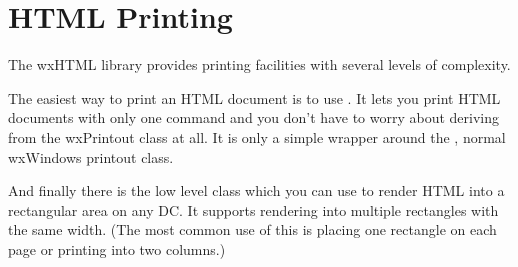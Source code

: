 \section{HTML Printing}\label{printing}

The wxHTML library provides printing facilities with several levels of complexity. 

The easiest way to print an HTML document is to use 
. It lets you print HTML documents with only one
command and you don't have to worry about deriving from the wxPrintout class at all. It is only a simple wrapper around the 
, normal wxWindows printout class.

And finally there is the low level class  which you can use to
render HTML into a rectangular area on any DC. It supports rendering into multiple rectangles with the same
width. (The most common use of this is placing one rectangle on each page or printing into two columns.)

